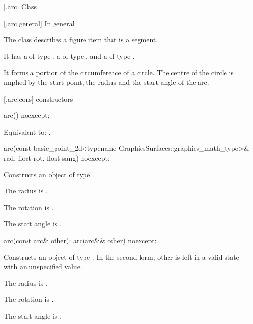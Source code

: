  [\iotwod.arc] {Class }

 [\iotwod.arc.general] {In general}

\pnum
{}%
The class  describes a figure item that is a segment.

\pnum
It has a  of type , a  of type , and a  of type .

\pnum
It forms a portion of the circumference of a circle. The centre of the circle is implied by the start point, the radius and the start angle of the arc.

 [\iotwod.arc.cons] { constructors}

%
\begin{itemdecl}
arc() noexcept;
\end{itemdecl}
\begin{itemdescr}
\pnum
\effects
Equivalent to: .
\end{itemdescr}

%
\begin{itemdecl}
arc(const basic_point_2d<typename GraphicsSurfaces::graphics_math_type>& rad,
  float rot, float sang) noexcept;
\end{itemdecl}
\begin{itemdescr}
\pnum
\effects
Constructs an object of type .

\pnum
The radius is .

\pnum
The rotation is .

\pnum
The start angle is .
\end{itemdescr}

%
\begin{itemdecl}
arc(const arc& other);
arc(arc&& other) noexcept;
\end{itemdecl}
\begin{itemdescr}
\pnum
\effects
Constructs an object of type . In the second form, other is left in a valid state with an unspecified value.

\pnum
The radius is .

\pnum
The rotation is .

\pnum
The start angle is .
\end{itemdescr}

